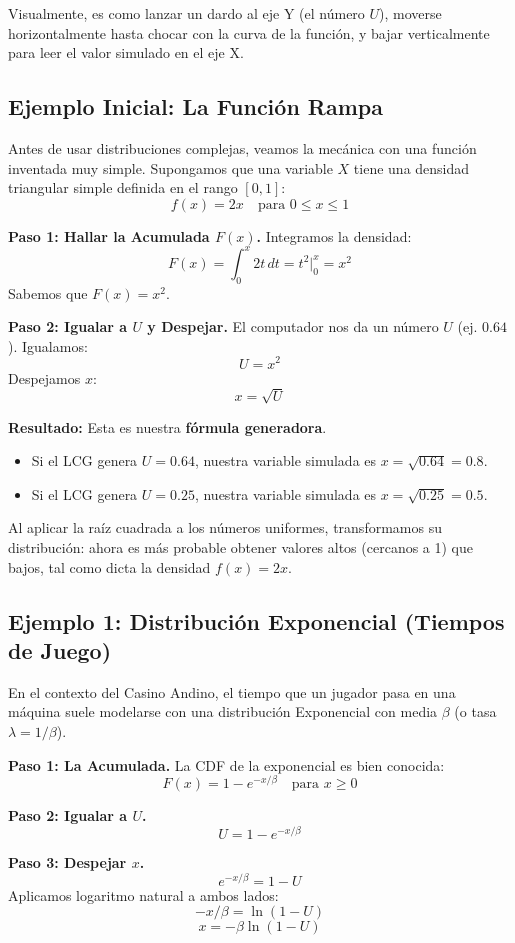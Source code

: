 \documentclass[11pt, letterpaper]{article}
\begin{document}
Visualmente, es como lanzar un dardo al eje Y (el número $U$), moverse horizontalmente hasta chocar con la curva de la función, y bajar verticalmente para leer el valor simulado en el eje X.

\subsection{Ejemplo Inicial: La Función Rampa}
Antes de usar distribuciones complejas, veamos la mecánica con una función inventada muy simple.
Supongamos que una variable $X$ tiene una densidad triangular simple definida en el rango $[0,1]$:
$$ f(x) = 2x \quad \text{para } 0 \le x \le 1 $$

\textbf{Paso 1: Hallar la Acumulada $F(x)$.}
Integramos la densidad:
$$ F(x) = \int_0^x 2t \, dt = t^2 \Big|_0^x = x^2 $$
Sabemos que $F(x) = x^2$.

\textbf{Paso 2: Igualar a $U$ y Despejar.}
El computador nos da un número $U$ (ej. $0.64$). Igualamos:
$$ U = x^2 $$
Despejamos $x$:
$$ x = \sqrt{U} $$

\textbf{Resultado:} Esta es nuestra \textbf{fórmula generadora}.
\begin{itemize}
    \item Si el LCG genera $U = 0.64$, nuestra variable simulada es $x = \sqrt{0.64} = 0.8$.
    \item Si el LCG genera $U = 0.25$, nuestra variable simulada es $x = \sqrt{0.25} = 0.5$.
\end{itemize}
Al aplicar la raíz cuadrada a los números uniformes, transformamos su distribución: ahora es más probable obtener valores altos (cercanos a 1) que bajos, tal como dicta la densidad $f(x)=2x$.

\subsection{Ejemplo 1: Distribución Exponencial (Tiempos de Juego)}
En el contexto del Casino Andino, el tiempo que un jugador pasa en una máquina suele modelarse con una distribución Exponencial con media $\beta$ (o tasa $\lambda = 1/\beta$).

\textbf{Paso 1: La Acumulada.}
La CDF de la exponencial es bien conocida:
$$ F(x) = 1 - e^{-x/\beta} \quad \text{para } x \ge 0 $$

\textbf{Paso 2: Igualar a $U$.}
$$ U = 1 - e^{-x/\beta} $$

\textbf{Paso 3: Despejar $x$.}
$$ e^{-x/\beta} = 1 - U $$
Aplicamos logaritmo natural a ambos lados:
$$ -x/\beta = \ln(1 - U) $$
$$ x = -\beta \ln(1 - U) $$
\end{document}
